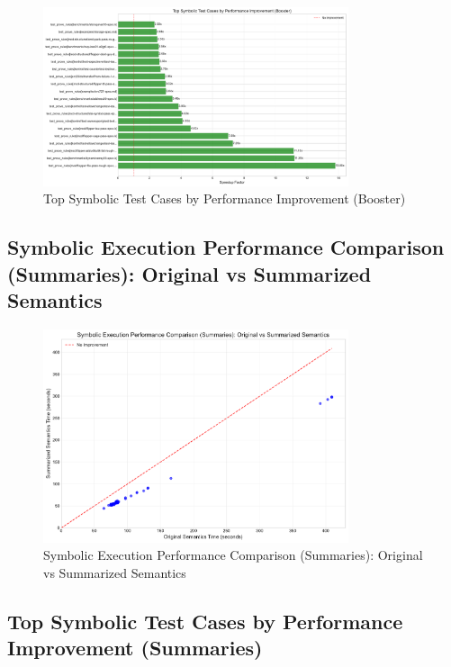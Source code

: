 \documentclass[article]{article}
\begin{document}
\begin{figure}[H]
\centering
\includegraphics[width=0.8\textwidth]{charts/symbolic_booster_test_case_improvement.pdf}
\caption{Top Symbolic Test Cases by Performance Improvement (Booster)}
\label{fig:symbolic_booster_test_case_improvement}
\end{figure}

\newpage

\subsection{Symbolic Execution Performance Comparison (Summaries): Original vs Summarized Semantics}\label{fig:symbolic_summaries_performance_scatter}

\begin{figure}[H]
\centering
\includegraphics[width=0.8\textwidth]{charts/symbolic_summaries_performance_scatter.pdf}
\caption{Symbolic Execution Performance Comparison (Summaries): Original vs Summarized Semantics}
\label{fig:symbolic_summaries_performance_scatter}
\end{figure}

\newpage

\subsection{Top Symbolic Test Cases by Performance Improvement (Summaries)}\label{fig:symbolic_summaries_test_case_improvement}
\end{document}
